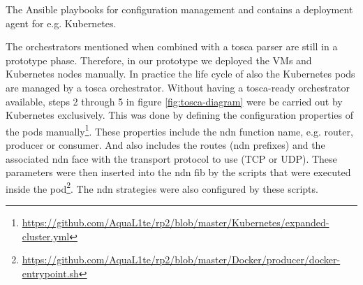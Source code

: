 \documentclass[conference]{IEEEtran}
\begin{document}
 The Ansible playbooks for configuration management and contains a deployment agent for e.g. Kubernetes. 
 

The orchestrators mentioned when combined with a \gls{tosca} parser are still in a prototype phase. Therefore, in our prototype we deployed the VMs and Kubernetes nodes manually. In practice the life cycle of also the Kubernetes pods are managed by a \gls{tosca} orchestrator. Without having a \gls{tosca}-ready orchestrator available, steps 2 through 5 in figure \ref{fig:tosca-diagram} were be carried out by Kubernetes exclusively. This was done by defining the configuration properties of the pods manually\footnote{\url{https://github.com/AquaL1te/rp2/blob/master/Kubernetes/expanded-cluster.yml}}. These properties include the \gls{ndn} function name, e.g. router, producer or consumer. And also includes the routes (\gls{ndn} prefixes) and the associated \gls{ndn} face with the transport protocol to use (TCP or UDP). These parameters were then inserted into the \gls{ndn} \gls{fib} by the scripts that were executed inside the pod\footnote{\url{https://github.com/AquaL1te/rp2/blob/master/Docker/producer/docker-entrypoint.sh}}. The \gls{ndn} strategies were also configured by these scripts.


\end{document}
